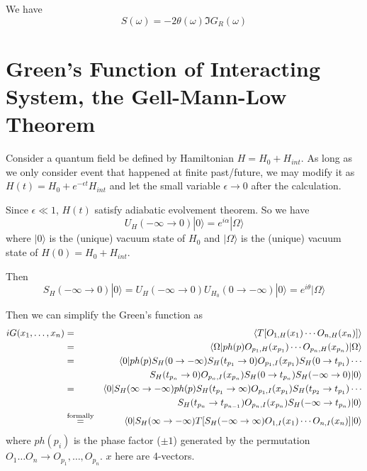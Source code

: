 \documentclass[12pt]{book}
\begin{document}
	We have
	\begin{equation}
		S(\omega)=-2\theta(\omega)\Im G_R(\omega)
	\end{equation}
			
	\section{Green's Function of Interacting System, the Gell-Mann-Low Theorem}
	
	Consider a quantum field be defined by Hamiltonian $H=H_0+H_{int}$. As long as we only consider event that happened at finite past/future, we may modify it as $H(t)=H_0+e^{-\epsilon t}H_{int}$ and let the small variable $\epsilon\rightarrow 0$ after the calculation.

	Since $\epsilon\ll 1$, $H(t)$ satisfy adiabatic evolvement theorem. So we have
	\begin{equation}
		U_H(-\infty \rightarrow 0)|0\rangle=e^{i\alpha}|\Omega\rangle
	\end{equation}
	where $|0\rangle$ is the (unique) vacuum state of $H_0$ and $|\Omega\rangle$ is the (unique) vacuum state of $H(0)=H_0+H_{int}$.
	
	Then
	\begin{equation}
		S_H(-\infty \rightarrow 0)|0\rangle=U_H(-\infty \rightarrow 0)U_{H_0}(0 \rightarrow -\infty)|0\rangle=e^{i\theta}|\Omega\rangle
	\end{equation}
	
	Then we can simplify the Green's function as
	\begin{eqnarray}
		iG(x_1,\dots,x_n)&=&\langle T[O_{1,H}(x_1)\cdots O_{n,H}(x_n)]\rangle\\
		&=&\langle\Omega| ph(p) O_{p_1,H}(x_{p_1})\cdots O_{p_n,H}(x_{p_n})|\Omega\rangle\\
		&=&\langle 0|ph(p)S_H(0\rightarrow -\infty) S_H(t_{p_1}\rightarrow 0)O_{p_1,I}(x_{p_1})S_H(0\rightarrow t_{p_1})\cdots \nonumber\\
		&&S_H(t_{p_n}\rightarrow 0)O_{p_n,I}(x_{p_n})S_H(0\rightarrow t_{p_n})S_H(-\infty \rightarrow 0)|0\rangle\\
		&=&\langle 0|S_H(\infty\rightarrow -\infty)ph(p)S_H(t_{p_1}\rightarrow \infty)O_{p_1,I}(x_{p_1})S_H(t_{p_2}\rightarrow t_{p_1})\cdots \nonumber\\
		&&S_H(t_{p_n}\rightarrow t_{p_{n-1}})O_{p_n,I}(x_{p_n})S_H(-\infty \rightarrow t_{p_n})|0\rangle\\
		&\stackrel{\rm formally}{=}&\langle 0|S_H(\infty\rightarrow -\infty) T[S_H(-\infty\rightarrow \infty)O_{1,I}(x_1)\cdots O_{n,I}(x_n)]|0\rangle
	\end{eqnarray}
	where $ph(p_i)$ is the phase factor ($\pm 1$) generated by the permutation $O_1 \dots O_n\rightarrow O_{p_1},\dots,O_{p_n}$. $x$ here are 4-vectors.
	
\end{document}
